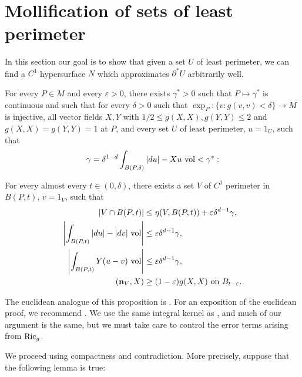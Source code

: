\section{Mollification of sets of least perimeter}\label{MollifierSection}
In this section our goal is to show that given a set $U$ of least perimeter, we can find a $C^1$ hypersurface $N$ which approximates $\partial^* U$ arbitrarily well.

\begin{proposition}\label{mollifier quant}
    For every $P \in M$ and every $\varepsilon > 0$, there exists $\gamma^* > 0$ such that $P \mapsto \gamma^*$ is continuous and such that for every $\delta > 0$ such that $\exp_P: \{v: g(v, v) < \delta\} \to M$ is injective, all vector fields $X, Y$ with $1/2 \leq g(X, X), g(Y, Y) \leq 2$ and $g(X, X) = g(Y, Y) = 1$ at $P$, and every set $U$ of least perimeter, $u = 1_U$, such that 
    \begin{equation}\label{bootstrap the mollifier}
    \gamma = \delta^{1 - d}\int_{B(P, \delta)} |du| - Xu ~\mathrm{vol} < \gamma^*:
    \end{equation}
    
    For every almost every $t \in (0, \delta)$, there exists a set $V$ of $C^1$ perimeter in $B(P, t)$, $v = 1_V$, such that 
    \begin{align}
    |V \cap B(P, t)| &\leq \eta(V, B(P, t)) + \varepsilon \delta^{d - 1} \gamma, \label{mollifier quant1}\\
    \left|\int_{B(P, t)} |du| - |dv| ~\mathrm{vol}\right| &\leq \varepsilon \delta^{d - 1} \gamma, \label{mollifier quant2}\\
    \left|\int_{B(P, t)} Y(u - v) ~\mathrm{vol}\right| &\leq \varepsilon \delta^{d - 1} \gamma, \label{mollifier quant3}\\
    (\mathbf n_V, X) &\geq (1 - \varepsilon) g(X, X) \text{ on } B_{t-\varepsilon}. \label{mollifier quant4}
    \end{align}
\end{proposition}

The euclidean analogue of this proposition is \cite[Lemma 5.5]{Miranda66}.
For an exposition of the euclidean proof, we recommend \cite[Chapter 7]{Giusti77}.
We use the same integral kernel as \cite[Chapter 7]{Giusti77}, and much of our argument is the same, but we must take care to control the error terms arising from $\mathrm{Ric}_g$.

We proceed using compactness and contradiction. More precisely, suppose that the following lemma is true:

